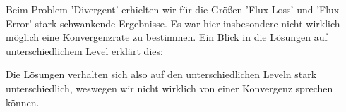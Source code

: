 \documentclass[12pt,a4paper]{scrartcl}
\numberwithin{equation}{section}
\begin{document}
\begin{enumerate}[label=(\roman*)]
\begin{figure}[H]
	\centering
	
\end{figure}
Beim Problem 'Divergent' erhielten wir für die Größen 'Flux Loss' und 'Flux Error' stark schwankende Ergebnisse. Es war hier insbesondere nicht wirklich möglich eine Konvergenzrate zu bestimmen. Ein Blick in die Lösungen auf unterschiedlichem Level erklärt dies:
\begin{figure}[H]
	\centering
\end{figure}

Die Lösungen verhalten sich also auf den unterschiedlichen Leveln stark unterschiedlich, weswegen wir nicht wirklich von einer Konvergenz sprechen können.



\end{enumerate}
\end{document}
